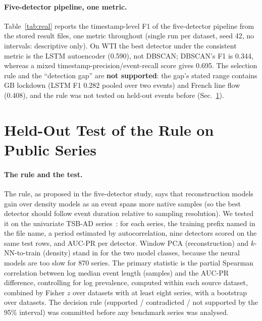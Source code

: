 \documentclass[10pt,twocolumn]{article}
\begin{document}
\paragraph{Five-detector pipeline, one metric.} Table~\ref{tab:real} reports the timestamp-level F1 of the five-detector pipeline from the stored result files, one metric throughout (single run per dataset, seed 42, no intervals: descriptive only). On WTI the best detector under the consistent metric is the LSTM autoencoder (0.590), not DBSCAN; DBSCAN's F1 is 0.344, whereas a mixed timestamp-precision/event-recall score gives 0.695. The selection rule and the ``detection gap'' are \textbf{not supported}: the gap's stated range contains GB lockdown (LSTM F1 0.282 pooled over two events) and French line flow (0.408), and the rule was not tested on held-out events before (Sec.~\ref{sec:public}).

\begin{table}[t]
\centering\scriptsize\setlength{\tabcolsep}{1.6pt}

\caption{Timestamp-level F1 of the five-detector pipeline (best per row in bold); Split: forward 70/30 (A or ``forward'') or clean-window (B). Single run, seed 42.}\label{tab:real}
\end{table}

\section{Held-Out Test of the Rule on Public Series}\label{sec:public}
\paragraph{The rule and the test.} The rule, as proposed in the five-detector study, says that reconstruction models gain over density models as an event spans more native samples (so the best detector should follow event duration relative to sampling resolution). We tested it on the univariate TSB-AD series~\cite{liu2024elephant}: for each series, the training prefix named in the file name, a period estimated by autocorrelation, nine detectors scored on the same test rows, and AUC-PR per detector. Window PCA (reconstruction) and $k$-NN-to-train (density) stand in for the two model classes, because the neural models are too slow for 870 series. The primary statistic is the partial Spearman correlation between log median event length (samples) and the AUC-PR difference, controlling for log prevalence, computed within each source dataset, combined by Fisher $z$ over datasets with at least eight series, with a bootstrap over datasets. The decision rule (supported / contradicted / not supported by the 95\% interval) was committed before any benchmark series was analysed.
\end{document}
